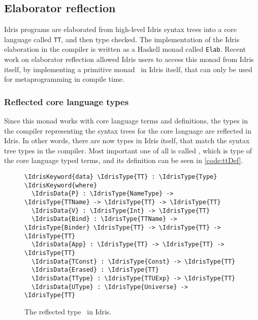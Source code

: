 \subsection{Elaborator reflection}\label{ssec:elabref}

Idris programs are elaborated from high-level Idris syntax trees into a core
language called \texttt{TT}, and then type checked.\cite{idris}
The implementation of the Idris elaboration in the compiler is written as a
Haskell monad called \texttt{Elab}.
Recent work on elaborator reflection\cite{elabref} allowed Idris users to
access this monad from Idris itself, by implementing a primitive monad
\Elab\ in Idris itself, that can only be used for metaprogramming in compile
time.

\subsubsection{Reflected core language types}\label{sssec:reflectedTypes}

Since this monad works with core language terms and definitions, the types in
the compiler representing the syntax trees for the core language are reflected
in Idris. In other words, there are now types in Idris itself, that match the
syntax tree types in the compiler. Most important one of all is called \TT,
which is type of the core language typed terms, and its definition can be seen
in \autoref{code:ttDef}.

\begin{figure}[ht]
\caption{The reflected type \protect\TT\ in Idris.}
\label{code:ttDef}
\begin{Verbatim}[framesep=2mm, label=\footnotesize{\normalfont{Idris}}, labelposition=topline]
\IdrisKeyword{data} \IdrisType{TT} : \IdrisType{Type} \IdrisKeyword{where}
  \IdrisData{P} : \IdrisType{NameType} -> \IdrisType{TTName} -> \IdrisType{TT} -> \IdrisType{TT}
  \IdrisData{V} : \IdrisType{Int} -> \IdrisType{TT}
  \IdrisData{Bind} : \IdrisType{TTName} -> \IdrisType{Binder} \IdrisType{TT} -> \IdrisType{TT} -> \IdrisType{TT}
  \IdrisData{App} : \IdrisType{TT} -> \IdrisType{TT} -> \IdrisType{TT}
  \IdrisData{TConst} : \IdrisType{Const} -> \IdrisType{TT}
  \IdrisData{Erased} : \IdrisType{TT}
  \IdrisData{TType} : \IdrisType{TTUExp} -> \IdrisType{TT}
  \IdrisData{UType} : \IdrisType{Universe} -> \IdrisType{TT}
\end{Verbatim}
\end{figure}

